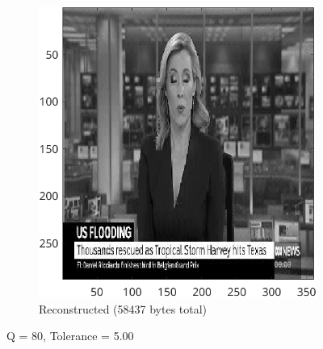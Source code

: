 \documentclass{article}
\begin{document}
\begin{figure}[ht]
\begin{subfigure}[t]{0.45\textwidth}
			\includegraphics[width=\textwidth]{2B_Input4Reconstructed2}

			\caption{Reconstructed (58437 bytes total)}
			\label{fig:2B_Input4Reconstructed2}

		\end{subfigure}

		\caption{Q = 80, Tolerance = 5.00}
		\label{fig:2B_Input4b}
	\end{figure}
\end{document}
